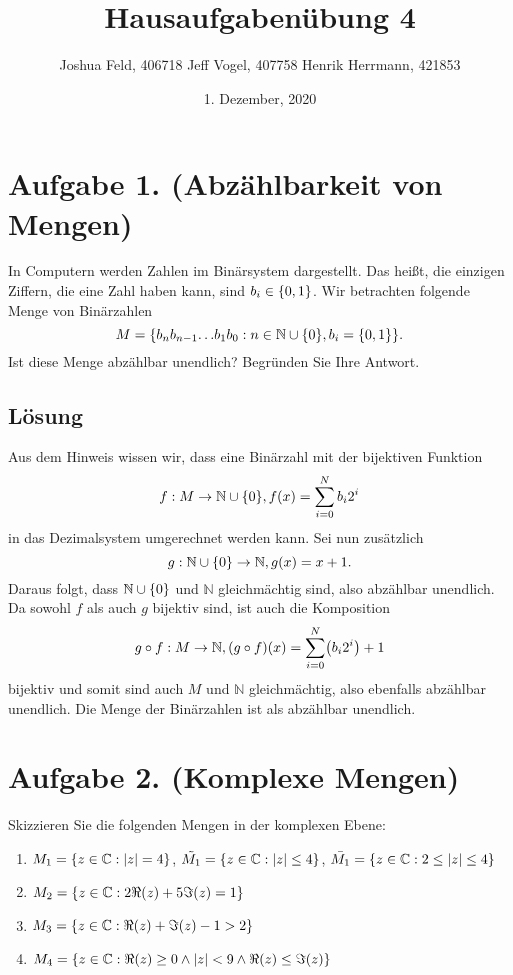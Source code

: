 \documentclass[german,12pt]{homework}
\title{Hausaufgabenübung 4}
\author{Joshua Feld, 406718 \quad Jeff Vogel, 407758 \quad Henrik Herrmann, 421853}
\date{1. Dezember, 2020}
\institute{RWTH Aachen University\\Center for Computational Engineering Science}
\newcommand{\NN}{\mathbb{N}}
\newcommand{\CC}{\mathbb{C}}
\DeclarePairedDelimiter{\absolute}{\lvert}{\rvert}
\DeclarePairedDelimiter{\enbrace}{(}{)}
\DeclarePairedDelimiter{\penbrace}{\{}{\}}
\begin{document}
    \maketitle

    \section*{Aufgabe 1. (Abzählbarkeit von Mengen)}

    \begin{problem}
        In Computern werden Zahlen im Binärsystem dargestellt. Das heißt, die
        einzigen Ziffern, die eine Zahl haben kann, sind \(b_i \in
        \penbrace*{0, 1}\). Wir betrachten folgende Menge von Binärzahlen
        \[M = \penbrace*{b_nb_{n - 1}{\ldots}b_1b_0: n \in \NN \cup
        \penbrace*{0}, b_i = \penbrace*{0, 1}}.\]
        Ist diese Menge abzählbar unendlich? Begründen Sie Ihre Antwort.
    \end{problem}

    \subsection*{Lösung}  Aus dem Hinweis wissen wir, dass eine Binärzahl mit
    der bijektiven Funktion
    \[f: M \to \NN \cup \penbrace*{0}, f\enbrace*{x} = \sum_{i = 0}^Nb_i2^i\]
    in das Dezimalsystem umgerechnet werden kann. Sei nun zusätzlich
    \[g: \NN \cup \penbrace*{0} \to \NN, g\enbrace*{x} = x + 1.\]
    Daraus folgt, dass \(\NN \cup \penbrace*{0}\) und \(\NN\) gleichmächtig
    sind, also abzählbar unendlich. Da sowohl \(f\) als auch \(g\) bijektiv
    sind, ist auch die Komposition
    \[g \circ f: M \to \NN, \enbrace*{g \circ f}\enbrace*{x} = \sum_{i =
    0}^N\enbrace*{b_i2^i} + 1\]
    bijektiv und somit sind auch \(M\) und \(\NN\) gleichmächtig, also
    ebenfalls abzählbar unendlich. Die Menge der Binärzahlen ist als abzählbar
    unendlich.

    \section*{Aufgabe 2. (Komplexe Mengen)}

    \begin{problem}
        Skizzieren Sie die folgenden Mengen in der komplexen Ebene:
        \begin{enumerate}
            \item \(M_1 = \penbrace*{z \in \CC: \absolute*{z} = 4}\),
            \(\tilde{M_1} = \penbrace*{z \in \CC: \absolute*{z} \le 4}\),
            \(\bar{M_1} = \penbrace*{z \in \CC: 2 \le \absolute*{z} \le 4}\)
            \item \(M_2 = \penbrace*{z \in \CC: 2\Re\enbrace*{z} +
            5\Im\enbrace*{z} = 1}\)
            \item \(M_3 = \penbrace*{z \in \CC: \Re\enbrace*{z} +
            \Im\enbrace*{z} - 1 > 2}\)
            \item \(M_4 = \penbrace*{z \in \CC: \Re\enbrace*{z} \ge 0 \land
            \absolute*{z} < 9 \land \Re\enbrace*{z} \le \Im\enbrace*{z}}\)
        \end{enumerate}
    \end{problem}
\end{document}
